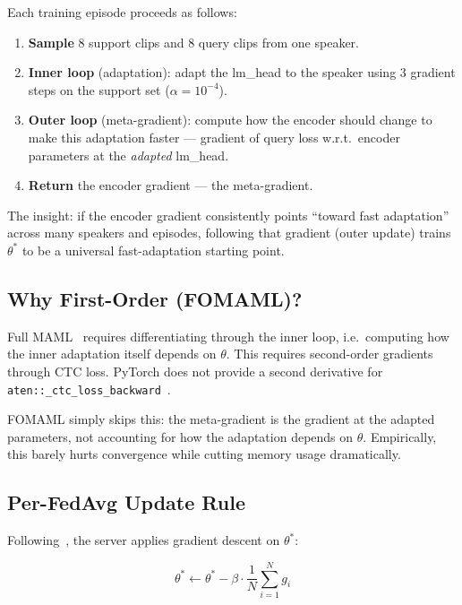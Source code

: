 \documentclass[11pt,a4paper]{article}
\theoremstyle{definition}
\begin{document}
Each training episode proceeds as follows:

\begin{enumerate}[leftmargin=*]
  \item \textbf{Sample} 8 support clips and 8 query clips from one speaker.
  \item \textbf{Inner loop} (adaptation): adapt the lm\_head to the speaker using
        3 gradient steps on the support set ($\alpha = 10^{-4}$).
  \item \textbf{Outer loop} (meta-gradient): compute how the encoder should change
        to make this adaptation faster --- gradient of query loss w.r.t.\ encoder
        parameters at the \emph{adapted} lm\_head.
  \item \textbf{Return} the encoder gradient --- the meta-gradient.
\end{enumerate}

The insight: if the encoder gradient consistently points ``toward fast
adaptation'' across many speakers and episodes, following that gradient (outer
update) trains $\theta^*$ to be a universal fast-adaptation starting point.

\subsection{Why First-Order (FOMAML)?}

Full MAML~\cite{finn2017maml} requires differentiating through the inner loop,
i.e.\ computing how the inner adaptation itself depends on $\theta$.  This
requires second-order gradients through CTC loss.  PyTorch does not provide a
second derivative for \texttt{aten::\_ctc\_loss\_backward}~\cite{nichol2018fomaml}.

FOMAML simply skips this: the meta-gradient is the gradient at the adapted
parameters, not accounting for how the adaptation depends on $\theta$.
Empirically, this barely hurts convergence while cutting memory usage
dramatically.

\subsection{Per-FedAvg Update Rule}

Following~\cite{fallah2020perfedavg}, the server applies gradient descent on
$\theta^*$:

\begin{equation}
\theta^* \leftarrow \theta^* - \beta \cdot \frac{1}{N}\sum_{i=1}^{N} g_i
\label{eq:perfedavg}
\end{equation}
\end{document}

